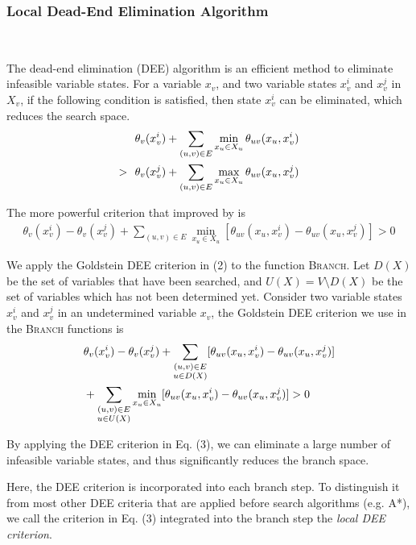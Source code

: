 \subsubsection{Local Dead-End Elimination Algorithm}\

\noindent The dead-end elimination (DEE) algorithm is an efficient method to eliminate infeasible variable states. For a variable $x_v$, and two variable states $x_v^i$ and $x_v^j$ in $X_v$, if the following condition is satisfied, then state $x_v^i$ can be eliminated, which reduces the search space.
\begin{align}
& \theta_v(x_v^i)+\sum_{(u,v)\in E}\min_{x_u\in X_u}\theta_{uv}(x_u,x_v^i) \notag \\
>\ \ & \theta_v(x_v^j)+\sum_{(u,v)\in E}\max_{x_u\in X_u}\theta_{uv}(x_u,x_v^j)
\end{align}

The more powerful criterion that improved by \cite{goldstein1994efficient} is
\begin{align}
\theta_v(x_v^i)-\theta_v(x_v^j)+\sum_{(u,v)\in E}\min_{x_u\in X_u}[\theta_{uv}(x_u,x_v^i)-\theta_{uv}(x_u,x_v^j)] > 0
\end{align}

We apply the Goldstein DEE criterion in (2) to the function \textsc{Branch}. Let $D(X)$ be the set of variables that have been searched, and $U(X)=V\setminus D(X)$ be the set of variables which has not been determined yet. Consider two variable states $x_v^i$ and $x_v^j$ in an undetermined variable $x_v$, the Goldstein DEE criterion we use in the \textsc{Branch} functions is
\begin{align}
& \theta_v(x_v^i)-\theta_v(x_v^j)+\sum_{\substack{(u,v)\in E\\ u\in D(X)}}[\theta_{uv}(x_u,x_v^i)-\theta_{uv}(x_u,x_v^j)] \notag \\
& +\sum_{\substack{(u,v)\in E\\ u\in U(X)}}\min_{x_u\in X_u}[\theta_{uv}(x_u,x_v^i)-\theta_{uv}(x_u,x_v^j)] > 0
\end{align}

By applying the DEE criterion in Eq. (3), we can eliminate a large number of infeasible variable states, and thus significantly reduces the branch space.

Here, the DEE criterion is incorporated into each branch step. To distinguish it from most other DEE criteria that are applied before search algorithms (e.g. A*\cite[]{gainza2013osprey}), we call the criterion in Eq. (3) integrated into the branch step the \textit{local DEE criterion}.

